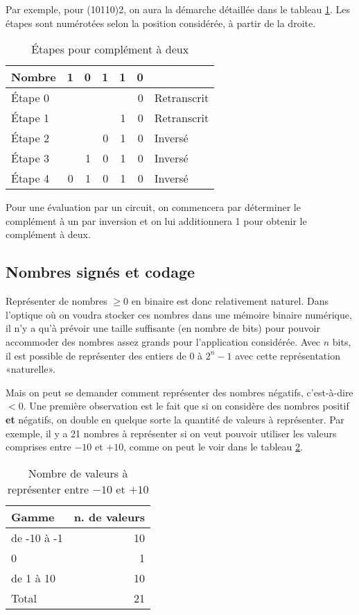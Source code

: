 \documentclass[11pt]{article}
\begin{document}
Par exemple, pour (10110)2, on aura la démarche détaillée dans le
tableau \ref{tab:org15a8a87}. Les étapes sont numérotées selon la position
considérée, à partir de la droite.

\begin{table}[htbp]
\caption{\label{tab:org15a8a87}Étapes pour complément à deux}
\centering
\begin{tabular}{lrrrrrl}
Nombre & 1 & 0 & 1 & 1 & 0 & \\
\hline
Étape 0 &  &  &  &  & 0 & Retranscrit\\
Étape 1 &  &  &  & 1 & 0 & Retranscrit\\
Étape 2 &  &  & 0 & 1 & 0 & Inversé\\
Étape 3 &  & 1 & 0 & 1 & 0 & Inversé\\
Étape 4 & 0 & 1 & 0 & 1 & 0 & Inversé\\
\end{tabular}
\end{table}

Pour une évaluation par un circuit, on commencera par déterminer le
complément à un par inversion et on lui additionnera 1 pour obtenir le
complément à deux.

\subsection{Nombres signés et codage}
\label{sec:org17e0bfb}

Représenter de nombres \(\geq 0\) en binaire est donc relativement
naturel. Dans l'optique où on voudra stocker ces nombres dans une
mémoire binaire numérique, il n'y a qu'à prévoir une taille suffisante
(en nombre de bits) pour pouvoir accommoder des nombres assez grands
pour l'application considérée. Avec \(n\) bits, il est possible de
représenter des entiers de 0 à \(2^n-1\) avec cette représentation
«naturelle».

Mais on peut se demander comment représenter des nombres négatifs,
c'est-à-dire \(< 0\). Une première observation est le fait que si on
considère des nombres positif \textbf{et} négatifs, on double en quelque
sorte la quantité de valeurs à représenter. Par exemple, il y a 21
nombres à représenter si on veut pouvoir utiliser les valeurs
comprises entre \(-10\) et \(+10\), comme on peut le voir dans le
tableau \ref{tab:orgd680564}.

\begin{table}[htbp]
\caption{\label{tab:orgd680564}Nombre de valeurs à représenter entre \(-10\) et \(+10\)}
\centering
\begin{tabular}{lr}
Gamme & n. de valeurs\\
\hline
de -10 à -1 & 10\\
0 & 1\\
de 1 à 10 & 10\\
\hline
Total & 21\\
\end{tabular}
\end{table}
\end{document}
